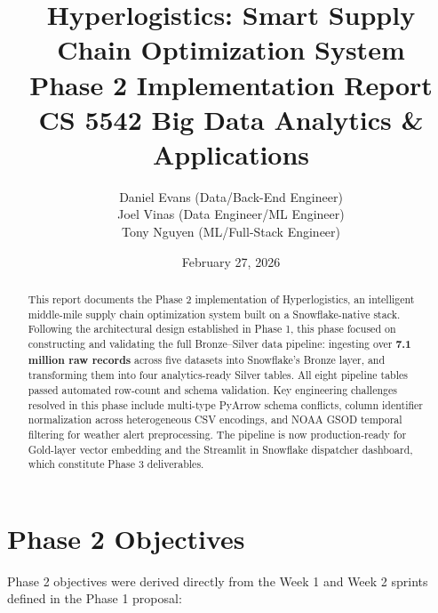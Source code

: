 \documentclass[14.5pt,letterpaper]{article}
\title{\textbf{Hyperlogistics: Smart Supply Chain Optimization System} \\
\large Phase 2 Implementation Report \\
\normalsize CS 5542 Big Data Analytics \& Applications}
\author{
    Daniel Evans (Data/Back-End Engineer) \\
    Joel Vinas (Data Engineer/ML Engineer) \\
    Tony Nguyen (ML/Full-Stack Engineer)
}
\date{February 27, 2026}
\begin{document}
\maketitle
\thispagestyle{empty}

\begin{abstract}
This report documents the Phase 2 implementation of Hyperlogistics, an intelligent middle-mile supply chain optimization system built on a Snowflake-native stack. Following the architectural design established in Phase 1, this phase focused on constructing and validating the full Bronze--Silver data pipeline: ingesting over \textbf{7.1 million raw records} across five datasets into Snowflake's Bronze layer, and transforming them into four analytics-ready Silver tables. All eight pipeline tables passed automated row-count and schema validation. Key engineering challenges resolved in this phase include multi-type PyArrow schema conflicts, column identifier normalization across heterogeneous CSV encodings, and NOAA GSOD temporal filtering for weather alert preprocessing. The pipeline is now production-ready for Gold-layer vector embedding and the Streamlit in Snowflake dispatcher dashboard, which constitute Phase 3 deliverables.
\end{abstract}

\newpage
\tableofcontents
\newpage

\section{Phase 2 Objectives}

Phase 2 objectives were derived directly from the Week 1 and Week 2 sprints defined in the Phase 1 proposal:
\end{document}
